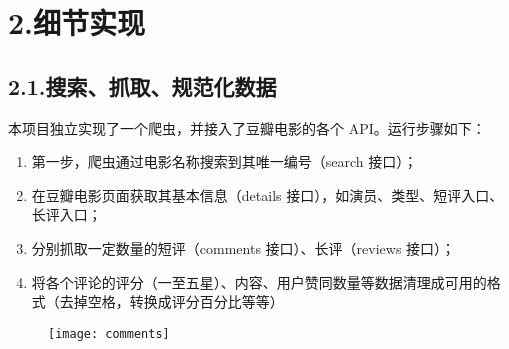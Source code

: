 \documentclass[10pt]{article}
\begin{document}
\section{2.\hspace*{0.5em}细节实现}\label{section}%

\subsection{2.1.\hspace*{0.5em}搜索、抓取、规范化数据}\label{section}%

\noindent{}本项目独立实现了一个爬虫，并接入了豆瓣电影的各个 API。运行步骤如下：%

\begin{enumerate}[noitemsep,topsep=\mdcompacttopsep]%

\item{}第一步，爬虫通过电影名称搜索到其唯一编号（search 接口）；%

\item{}在豆瓣电影页面获取其基本信息（details 接口），如演员、类型、短评入口、长评入口；%

\item{}分别抓取一定数量的短评（comments 接口）、长评（reviews 接口）；%

\item{}将各个评论的评分（一至五星）、内容、用户赞同数量等数据清理成可用的格式（去掉空格，转换成评分百分比等等）%
\end{enumerate}%

\begin{figure}[tbp]%
\begin{mdcenter}%

\noindent{}\texttt{[image: comments]}{}%

\mdhr{}%

\noindent{}%
\end{mdcenter}\label{fig-comments}%
\end{figure}%
\end{document}
